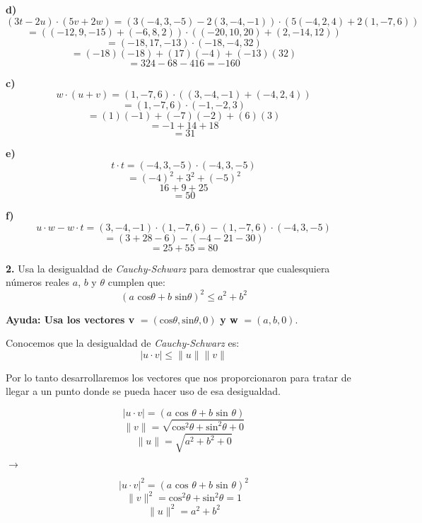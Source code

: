 \documentclass{article}
\begin{document}
\hspace*{4cm}\begin{minipage}[c]{0.5cm}
    \textbf{d)}
    $$(3t-2u)\cdot(5v+2w) = (3(-4, 3, -5 )-2(3, -4, -1 ))\cdot(5(-4, 2, 4)+2(1, -7, 6))$$
    $$=((-12, 9, -15)+ (-6, 8, 2))\cdot ((-20, 10, 20)+(2, -14, 12))$$
    $$=(-18, 17, -13)\cdot(-18, -4, 32 )$$
    $$=(-18)(-18)+(17)(-4)+(-13)(32)$$
    $$=324-68-416 = -160$$
\end{minipage}
\vspace{20pt}

\begin{minipage}[c]{0.5cm}
    \textbf{c)}
    $$w\cdot(u+v) = (1, -7, 6)\cdot((3, -4, -1 )+ (-4, 2, 4))$$
    $$=(1, -7 , 6) \cdot (-1, -2 , 3)$$
    $$=(1)(-1)+(-7)(-2)+(6)(3)$$
    $$=-1+14+18$$
    $$= 31$$
\end{minipage}\hspace*{7cm}
\begin{minipage}[c]{0.5cm}
    \textbf{e)}
    $$t\cdot t= (-4, 3, -5 )\cdot (-4, 3, -5 )$$
    $$= (-4)^2+ 3^2+ (-5)^2$$
    $$16 +9+ 25$$
    $$= 50$$
\end{minipage}
\newpage
\begin{minipage}[c]{0.5cm}
    \textbf{f)}
    $$u\cdot w - w \cdot t=(3, -4, -1 )\cdot (1, -7, 6)- (1, -7, 6)\cdot (-4, 3, -5 )$$
    $$=(3+28-6)-(-4-21-30)$$
    $$=25+55= 80$$
\end{minipage}
\vspace{10pt}

\textbf{2.} Usa la desigualdad de \emph{Cauchy-Schwarz} para demostrar que cualesquiera números reales
$a$, $b$ y $\theta$ cumplen que: 
$$(a \text{ cos}\theta + b \text{ sin}\theta)^2\leq a^2+b^2$$

\textbf{Ayuda: Usa los vectores v } $= (\text{cos}\theta, \text{sin}\theta,0)$ \textbf{y w} $=(a,b,0)$. 

Conocemos que la desigualdad de \emph{Cauchy-Schwarz} es: $$\left|u\cdot v\right| \leq \|u\|\|v\|$$

Por lo tanto desarrollaremos los vectores que nos proporcionaron para tratar de llegar a un punto donde se pueda 
hacer uso de esa desigualdad.

\begin{minipage}[c]{0.5cm}
    $$\left|u\cdot v\right| = (a \text{ cos }\theta + b \text{ sin }\theta)$$
    $$\|v\| =  \sqrt{\text{cos}^2\theta + \text{sin}^2\theta + 0}$$
    $$\|u\| = \sqrt{a^2+b^2 + 0}$$
\end{minipage}\hspace*{4cm}
$\rightarrow$\hspace*{0.5cm}
\begin{minipage}[c]{0.5cm}
    $$\left|u\cdot v\right|^2 = (a \text{ cos }\theta + b \text{ sin }\theta)^2$$
    $$\|v\|^2 =  \text{cos}^2\theta + \text{sin}^2\theta = 1$$
    $$\|u\|^2 = a^2+b^2$$
\end{minipage}
\vspace{10pt}
\end{document}
